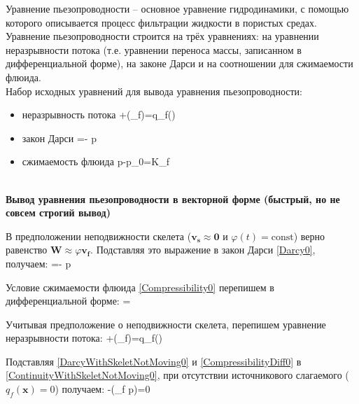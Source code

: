 \documentclass[main.tex]{subfiles}
\begin{document}
Уравнение пьезопроводности -- основное уравнение гидродинамики, с помощью которого описывается процесс фильтрации жидкости в пористых средах.
\\

Уравнение пьезопроводности строится на трёх уравнениях: на уравнении неразрывности потока (т.е. уравнении переноса массы, записанном в дифференциальной форме), на законе Дарси и на соотношении для сжимаемости флюида.
\\

Набор исходных уравнений для вывода уравнения пьезопроводности:
\begin{itemize}
	\item неразрывность потока
	\beq\label{Continuity0}
	+\pmb{\nabla}\cdot\left(\rho_f\varphi {}\right)=q_f()
	\eeq
	\item закон Дарси
	\beq\label{Darcy0}
	=-\cdot\pmb{\nabla} p
	\eeq
	\item сжимаемость флюида
	\beq\label{Compressibility0}
	p-p_0=K_f
	\eeq
\end{itemize}
\ \\

\textbf{Вывод уравнения пьезопроводности в векторной форме (быстрый, но не совсем строгий вывод)}

В предположении неподвижности скелета ($\pmb{v_s}\approx \pmb{0}$ и $\varphi(t)=\textrm{const}$) верно равенство $\pmb{W}\approx\varphi \pmb{v_f}$.
Подставляя это выражение в закон Дарси \eqref{Darcy0}, получаем:
\beq\label{DarcyWithSkeletNotMoving0}
\varphi {}=-\cdot\pmb{\nabla} p
\eeq

Условие сжимаемости флюида \eqref{Compressibility0} перепишем в дифференциальной форме:
\beq\label{CompressibilityDiff0}
=
\eeq

Учитывая предположение о неподвижности скелета, перепишем уравнение неразрывности потока:
\beq\label{ContinuityWithSkeletNotMoving0}
\varphi{}+\pmb{\nabla}\cdot\left(\rho_f\varphi{}\right)=q_f()
\eeq

Подставляя \eqref{DarcyWithSkeletNotMoving0} и \eqref{CompressibilityDiff0} в \eqref{ContinuityWithSkeletNotMoving0}, при отсутствии источникового слагаемого ($q_f(\pmb{x})=0$) получаем:
\beq
\varphi{}-\pmb{\nabla}\cdot\left(\rho_f\pmb{\nabla} p\right)=0
\eeq
\end{document}
